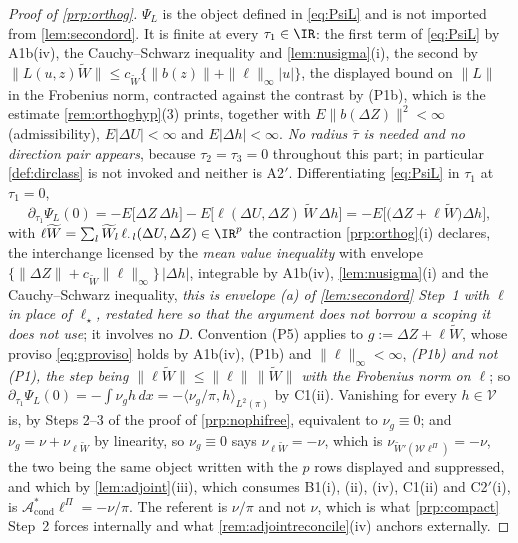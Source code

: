 \begin{proof}[Proof of \cref{prp:orthog}]
$\Psi_L$ is the object defined in \eqref{eq:PsiL} and is not imported from \cref{lem:secondord}.
It is finite at every $\tau_1\in\IR$: the first term of \eqref{eq:PsiL} by A1b(iv), the Cauchy--Schwarz
inequality and \cref{lem:nusigma}(i), the second by
$\|L(u,z)\widetilde W\|\le c_{\widetilde W}\{\|b(z)\|+\|\ell\|_\infty|u|\}$, the displayed bound on
$\|L\|$ in the Frobenius norm, contracted against the contrast by \textup{(P1b)}, which is the estimate
\cref{rem:orthoghyp}\textup{(3)} prints, together with
$E\|b(\Delta Z)\|^{2}<\infty$ (admissibility), $E|\Delta U|<\infty$ and $E|\Delta h|<\infty$. \emph{No
radius $\bar\tau$ is needed and no direction pair appears}, because $\tau_2=\tau_3=0$ throughout this
part; in particular \cref{def:dirclass} is not invoked and neither is A2$'$. Differentiating
\eqref{eq:PsiL} in $\tau_1$ at $\tau_1=0$,
\[
\partial_{\tau_1}\Psi_L(0)=-E\big[\Delta Z\,\Delta h\big]-E\big[\ell(\Delta U,\Delta Z)\,\widetilde W\,\Delta h\big]
=-E\big[\big(\Delta Z+\ell\widetilde W\big)\Delta h\big],
\]
with $\ell\widetilde W=\sum_{l}\widetilde W_l\,\ell_{\cdot\,l}(\Delta U,\Delta Z)\in\IR^{p}$ the
contraction \cref{prp:orthog}\textup{(i)} declares,
the interchange licensed by the \emph{mean value inequality} with envelope
$\{\|\Delta Z\|+c_{\widetilde W}\|\ell\|_\infty\}\,|\Delta h|$, integrable by A1b(iv),
\cref{lem:nusigma}(i) and the
Cauchy--Schwarz inequality, \emph{this is envelope \textup{(a)} of \cref{lem:secondord} Step~1 with
$\ell$ in place of $\ell_\star$, restated here so that the argument does not borrow a scoping it does not
use}; it involves no $D$.
Convention (P5) applies to
$g:=\Delta Z+\ell\widetilde W$, whose proviso \eqref{eq:gproviso} holds by A1b(iv), \textup{(P1b)} and
$\|\ell\|_\infty<\infty$, \emph{\textup{(P1b)} and not \textup{(P1)}, the step being
$\|\ell\widetilde W\|\le\|\ell\|\,\|\widetilde W\|$ with the Frobenius norm on $\ell$}; so
$\partial_{\tau_1}\Psi_L(0)=-\int\nu_gh\,dx=-\langle\nu_g/\pi,h\rangle_{L^{2}(\pi)}$ by C1(ii). Vanishing
for
every $h\in\mathcal V$ is, by Steps 2--3 of the proof of \cref{prp:nophifree}, equivalent to
$\nu_g\equiv0$; and $\nu_g=\nu+\nu_{\ell\widetilde W}$ by linearity, so $\nu_g\equiv0$ says
$\nu_{\ell\widetilde W}=-\nu$, which is $\nu_{\widetilde W'(\mathcal W\ell^\Pi)}=-\nu$, the two being
the same object written with the $p$ rows displayed and suppressed, and which by
\cref{lem:adjoint}(iii), which consumes B1(i), (ii), (iv),
C1(ii) and C2$'$(i), is
$\mathcal A^\ast_{\mathrm{cond}}\ell^\Pi=-\nu/\pi$. The referent is $\nu/\pi$ and not $\nu$,
which is what \cref{prp:compact} Step~2 forces internally and what \cref{rem:adjointreconcile}(iv)
anchors externally.


\end{proof}
